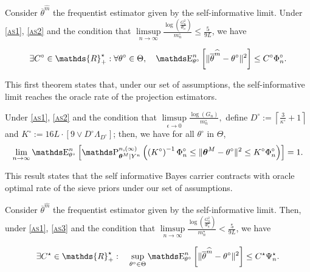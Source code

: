 \begin{thm}\label{thm3}
Consider $\overline{\theta}^{\widehat{m}}$ the frequentist estimator given by the self-informative limit.
Under \textsc{\cref{as1}}, \textsc{\cref{as2}} and the condition that $\limsup\limits_{n \rightarrow \infty}\frac{\log\left(\frac{G_{n}^{2}}{\Phi_{n}^{\circ}}\right)}{m_{n}^{\circ}} \leq \frac{5}{9 L}$, we have

\[\exists C^{\circ} \in \mathds{R}_{+}^{\star} : \forall \theta^{\circ} \in \Theta, \quad \E_{\theta^{\circ}}^{n}\left[\Vert \overline{\theta}^{\widehat{m}} - \theta^{\circ} \Vert^{2}\right] \leq C^{\circ} \Phi_{n}^{\circ}.\]
\end{thm}

This first theorem states that, under our set of assumptions, the self-informative limit reaches the oracle rate of the projection estimators.

\begin{thm}\label{thm4}
Under \textsc{\cref{as1}}, \textsc{\cref{as2}} and the condition that $\limsup\limits_{\epsilon \rightarrow 0} \frac{\log\left(G_{n}\right)}{m_{n}^{\circ}},$ define $D^{\circ} := \left\lceil \frac{3}{\kappa^{\circ}} + 1 \right\rceil$ and $K^{\circ} := 16 L \cdot \left[9 \vee D^{\circ} \Lambda_{D^{\circ}}\right]$; then, we have for all $\theta^{\circ}$ in $\Theta$,
\[\lim\limits_{n \rightarrow \infty} \E_{\theta^{\circ}}^{n}\left[\P_{\boldsymbol{\theta}^{M} \vert Y^{n}}^{n, (\infty)}\left(\left(K^{\circ}\right)^{-1} \Phi_{n}^{\circ} \leq \Vert \boldsymbol{\theta}^{M} - \theta^{\circ} \Vert^{2} \leq K^{\circ} \Phi_{n}^{\circ} \right)\right] = 1.\]
\end{thm}

This result states that the self informative Bayes carrier contracts with oracle optimal rate of the sieve priors under our set of assumptions.


\begin{thm}\label{thm5}
Consider $\overline{\theta}^{\widehat{m}}$ the frequentist estimator given by the self-informative limit.
Then, under \textsc{\cref{as1}}, \textsc{\cref{as3}} and the condition that $\limsup\limits_{n \rightarrow \infty}\frac{\log\left(\frac{G_{n}^{2}}{\Phi_{n}^{\star}}\right)}{m_{n}^{\star}} < \frac{5}{9 L}$, we have

\[\exists C^{\star} \in \mathds{R}_{+}^{\star} : \quad \sup\limits_{\theta^{\circ}\in \Theta}\E_{\theta^{\circ}}^{n}\left[\Vert \overline{\theta}^{\widehat{m}} - \theta^{\circ} \Vert^{2}\right] \leq C^{\star} \Psi_{n}^{\star}.\]
\end{thm}

